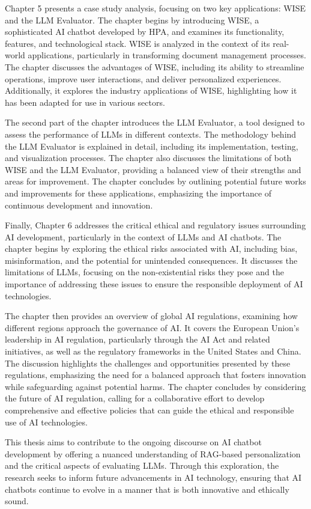 Chapter 5 presents a case study analysis, focusing on two key applications: WISE and the LLM Evaluator. The chapter begins by introducing WISE, a sophisticated AI chatbot developed by HPA, and examines its functionality, features, and technological stack. WISE is analyzed in the context of its real-world applications, particularly in transforming document management processes. The chapter discusses the advantages of WISE, including its ability to streamline operations, improve user interactions, and deliver personalized experiences. Additionally, it explores the industry applications of WISE, highlighting how it has been adapted for use in various sectors.

The second part of the chapter introduces the LLM Evaluator, a tool designed to assess the performance of LLMs in different contexts. The methodology behind the LLM Evaluator is explained in detail, including its implementation, testing, and visualization processes. The chapter also discusses the limitations of both WISE and the LLM Evaluator, providing a balanced view of their strengths and areas for improvement. The chapter concludes by outlining potential future works and improvements for these applications, emphasizing the importance of continuous development and innovation.

Finally, Chapter 6 addresses the critical ethical and regulatory issues surrounding AI development, particularly in the context of LLMs and AI chatbots. The chapter begins by exploring the ethical risks associated with AI, including bias, misinformation, and the potential for unintended consequences. It discusses the limitations of LLMs, focusing on the non-existential risks they pose and the importance of addressing these issues to ensure the responsible deployment of AI technologies.

The chapter then provides an overview of global AI regulations, examining how different regions approach the governance of AI. It covers the European Union’s leadership in AI regulation, particularly through the AI Act and related initiatives, as well as the regulatory frameworks in the United States and China. The discussion highlights the challenges and opportunities presented by these regulations, emphasizing the need for a balanced approach that fosters innovation while safeguarding against potential harms. The chapter concludes by considering the future of AI regulation, calling for a collaborative effort to develop comprehensive and effective policies that can guide the ethical and responsible use of AI technologies.

This thesis aims to contribute to the ongoing discourse on AI chatbot development by offering a nuanced understanding of RAG-based personalization and the critical aspects of evaluating LLMs. Through this exploration, the research seeks to inform future advancements in AI technology, ensuring that AI chatbots continue to evolve in a manner that is both innovative and ethically sound.
